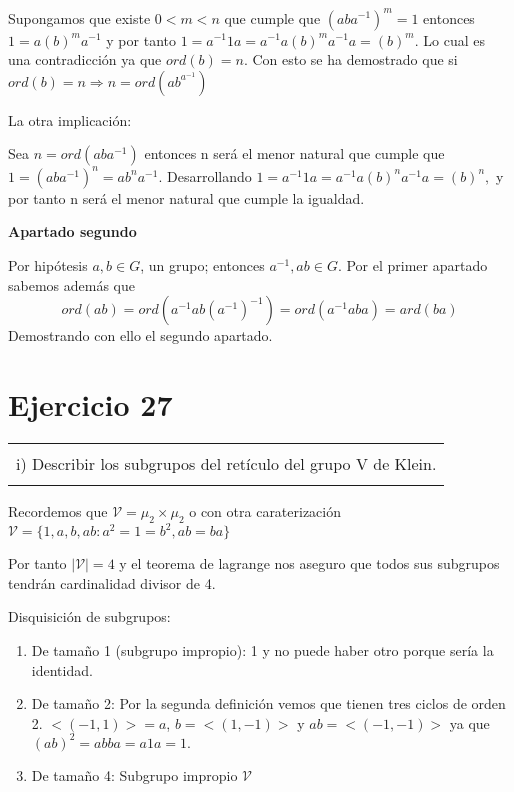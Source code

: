 \documentclass[12pt]{article}
\newenvironment{micaja}
{
    \begin{center}
    \begin{tabular}{|p{0.9\textwidth}|}
    \hline\\
    }   
    {   
    \\\\\hline
    \end{tabular} 
    \end{center}
    }
\begin{document}
Supongamos que existe $0<m<n$ que cumple que $(aba^{-1})^m  = 1$ entonces 
$1 = a(b)^ma^{-1}$ y por tanto $1 = a^{-1}1a = a^{-1}a(b)^ma^{-1}a = (b)^m.$ 
Lo cual es una contradicción ya que $ord(b)=n$.
Con esto se ha demostrado que si $ord(b)=n\Longrightarrow n = ord(ab^{a^{-1}})$

La otra implicación: 

Sea $n=ord(aba^{-1})$ entonces n será el menor natural que cumple que $1 = (aba^{-1})^n = ab^na^{-1}.$
Desarrollando $1 = a^{-1}1a = a^{-1}a(b)^na^{-1}a = (b)^n,$ y por tanto n será el menor natural que cumple la igualdad. 

\textbf{Apartado segundo}

Por hipótesis $a,b \in G$, un grupo; entonces $a^{-1},ab \in G$. Por el primer apartado sabemos además que
 $$ord(ab)=ord(a^{-1}ab(a^{-1})^{-1}) = ord(a^{-1}aba ) = ard(ba)$$
 Demostrando con ello el segundo apartado. 


\newpage


\section[Ejercicio 27]{Ejercicio 27}

\begin{micaja}
    i) Describir los subgrupos del retículo del grupo V de Klein. 
\end{micaja}  

Recordemos que $\mathcal V = \mu_2 \times \mu_2$ o con otra caraterización 
$\mathcal V = \{ 1,a,b,ab : a^2 = 1 = b^2, ab=ba\}$

Por tanto $|\mathcal V|=4$ y el teorema de lagrange nos aseguro que todos sus subgrupos tendrán cardinalidad
divisor de 4. 

Disquisición de subgrupos: 
\begin{enumerate}
         \item De tamaño 1 (subgrupo impropio): 1 y no puede haber otro porque sería la identidad. 
         \item De tamaño 2: Por la segunda definición vemos que tienen tres ciclos de orden 2. 
         $<(-1,1)> = a$, $b = <(1,-1)>$ y $ab =<(-1,-1)>$ ya que $(ab)^2 = abba= a1a = 1.$
         \item De tamaño 4: Subgrupo impropio  $\mathcal V$
    
\end{enumerate}
    

\end{document}
